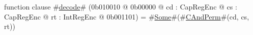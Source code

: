 function clause #\hyperref[sailMIPSzdecode]{decode}# (0b010010 @ 0b00000 @ cd : CapRegEnc @ cs : CapRegEnc @ rt : IntRegEnc @ 0b001101) = #\hyperref[sailMIPSzSome]{Some}#(#\hyperref[sailMIPSzCAndPerm]{CAndPerm}#(cd, cs, rt))
